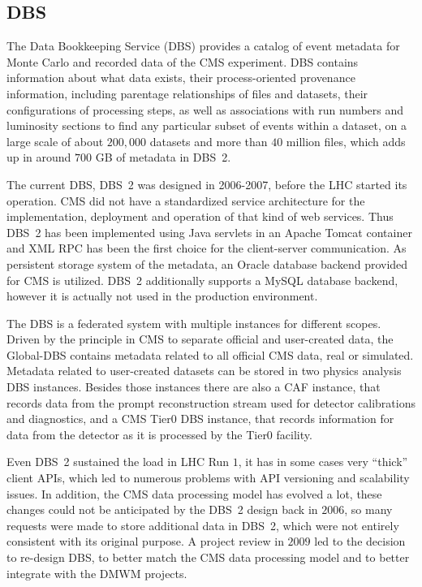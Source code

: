 \subsection{DBS}
The Data Bookkeeping Service (DBS) \cite{DBS} provides a catalog of event metadata for Monte Carlo and recorded data of the CMS experiment. DBS contains information about what data exists, their process-oriented provenance information, including parentage relationships of files and datasets, their configurations of processing steps, as well as associations with run numbers and luminosity sections to find any particular subset of events within a dataset, on a large scale of about $200,000$ datasets and more than $40$ million files, which adds up in around $700$ GB of metadata in DBS~2.

The current DBS, DBS~2 \cite{DBS2} was designed in 2006-2007, before the LHC started its operation. CMS did not have a standardized service architecture for the implementation, deployment and operation of that kind of web services. Thus DBS~2 has been implemented using Java servlets in an Apache Tomcat container and XML RPC has been the first choice for the client-server communication. As  persistent storage system of the metadata, an Oracle database backend provided for CMS \cite{CMSDBs} is utilized. DBS~2 additionally supports a MySQL database backend, however it is actually not used in the production environment.

The DBS is a federated system with multiple instances for different scopes. Driven by the principle in CMS to separate official and user-created data, the Global-DBS contains metadata related to all official CMS data, real or simulated. Metadata related to user-created datasets can be stored in two physics analysis DBS instances. Besides those instances there are also a CAF instance, that records data from the prompt reconstruction stream used for detector calibrations and diagnostics, and a CMS Tier0 DBS instance, that records information for data from the detector as it is processed by the Tier0 facility.

Even DBS~2 sustained the load in LHC Run $1$, it has in some cases very ``thick'' client APIs, which  led to numerous problems with API versioning and scalability issues. In addition, the CMS data processing model has evolved a lot, these changes could not be anticipated by the DBS~2 design back in $2006$, so many requests were made to store additional data in DBS~2, which were not entirely consistent with its original purpose. A project review in $2009$ led to the decision to re-design DBS, to better match the CMS data processing model and to better integrate with the DMWM projects.

